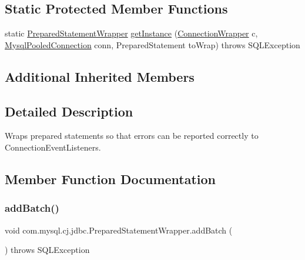 \subsection*{Static Protected Member Functions}
\begin{DoxyCompactItemize}
\item 
static \mbox{\hyperlink{classcom_1_1mysql_1_1cj_1_1jdbc_1_1_prepared_statement_wrapper}{Prepared\+Statement\+Wrapper}} \mbox{\hyperlink{classcom_1_1mysql_1_1cj_1_1jdbc_1_1_prepared_statement_wrapper_a3d847e5cf23f25be3a727cb459fbdafd}{get\+Instance}} (\mbox{\hyperlink{classcom_1_1mysql_1_1cj_1_1jdbc_1_1_connection_wrapper}{Connection\+Wrapper}} c, \mbox{\hyperlink{classcom_1_1mysql_1_1cj_1_1jdbc_1_1_mysql_pooled_connection}{Mysql\+Pooled\+Connection}} conn, Prepared\+Statement to\+Wrap)  throws S\+Q\+L\+Exception 
\end{DoxyCompactItemize}
\subsection*{Additional Inherited Members}


\subsection{Detailed Description}
Wraps prepared statements so that errors can be reported correctly to Connection\+Event\+Listeners. 

\subsection{Member Function Documentation}
\mbox{\label{classcom_1_1mysql_1_1cj_1_1jdbc_1_1_prepared_statement_wrapper_a489375b6557464827371090ab0f7f34d}} 
\subsubsection{\texorpdfstring{add\+Batch()}{addBatch()}}
{\footnotesize\ttfamily void com.\+mysql.\+cj.\+jdbc.\+Prepared\+Statement\+Wrapper.\+add\+Batch (\begin{DoxyParamCaption}{ }\end{DoxyParamCaption}) throws S\+Q\+L\+Exception}

